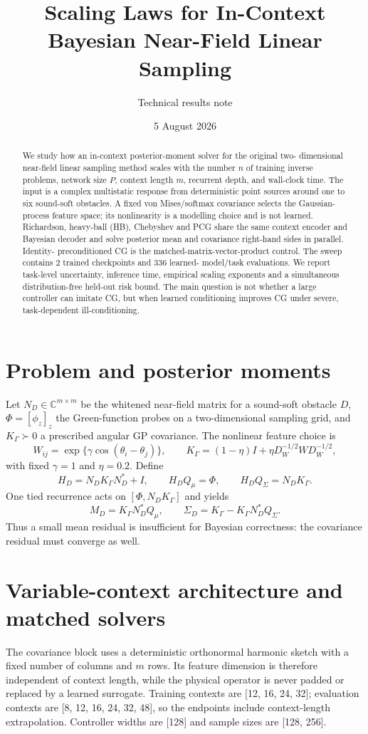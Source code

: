 \documentclass[10pt]{article}
\title{Scaling Laws for In-Context Bayesian Near-Field Linear Sampling}
\author{Technical results note}
\date{5 August 2026}
\begin{document}
\maketitle

\begin{abstract}
We study how an in-context posterior-moment solver for the original two-
dimensional near-field linear sampling method scales with the number $n$ of
training inverse problems, network size $P$, context length $m$, recurrent
depth, and wall-clock time.  The input is a complex multistatic response from
deterministic point sources around one to six sound-soft obstacles.  A fixed
von Mises/softmax covariance selects the Gaussian-process feature space; its
nonlinearity is a modelling choice and is not learned.  Richardson, heavy-ball
(HB), Chebyshev and PCG share the same context encoder and Bayesian decoder and
solve posterior mean and covariance right-hand sides in parallel.  Identity-
preconditioned CG is the matched-matrix-vector-product control.  The sweep
contains 2 trained checkpoints and 336 learned-
model/task evaluations.  We report task-level uncertainty, inference time,
empirical scaling exponents and a simultaneous distribution-free held-out
risk bound.  The main question is not whether a large controller can imitate
CG, but when learned conditioning improves CG under severe, task-dependent
ill-conditioning.
\end{abstract}

\section{Problem and posterior moments}
Let $N_D\in\mathbb C^{m\times m}$ be the whitened near-field matrix for a
sound-soft obstacle $D$, $\Phi=[\phi_z]_z$ the Green-function probes on a
two-dimensional sampling grid, and $K_\Gamma\succ0$ a prescribed angular GP
covariance.  The nonlinear feature choice is
\[
 W_{ij}=\exp\{\gamma\cos(\theta_i-\theta_j)\},\qquad
 K_\Gamma=(1-\eta)I+\eta D_W^{-1/2}WD_W^{-1/2},
\]
with fixed $\gamma=1$ and $\eta=0.2$.  Define
\[
 H_D=N_DK_\Gamma N_D^*+I,\qquad
 H_DQ_\mu=\Phi,\qquad H_DQ_\Sigma=N_DK_\Gamma.
\]
One tied recurrence acts on $[\Phi,N_DK_\Gamma]$ and yields
\[
 M_D=K_\Gamma N_D^*Q_\mu,\qquad
 \Sigma_D=K_\Gamma-K_\Gamma N_D^*Q_\Sigma.
\]
Thus a small mean residual is insufficient for Bayesian correctness: the
covariance residual must converge as well.

\section{Variable-context architecture and matched solvers}
The covariance block uses a deterministic orthonormal harmonic sketch with a
fixed number of columns and $m$ rows.  Its feature dimension is therefore
independent of context length, while the physical operator is never padded or
replaced by a learned surrogate.  Training contexts are
[12, 16, 24, 32]; evaluation contexts are
[8, 12, 16, 24, 32, 48], so the endpoints include context-length
extrapolation.  Controller widths are [128] and sample
sizes are [128, 256].
\end{document}
